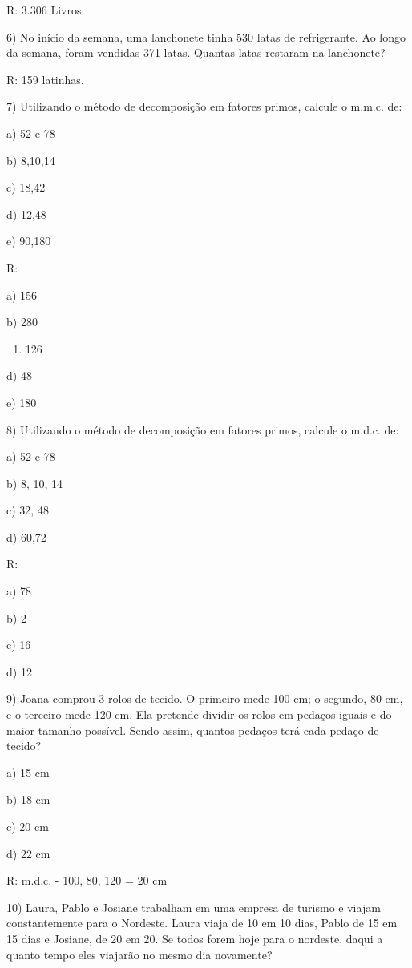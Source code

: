 R: 3.306 Livros

6) No início da semana, uma lanchonete tinha 530 latas de refrigerante.
Ao longo da semana, foram vendidas 371 latas. Quantas latas restaram na
lanchonete?

R: 159 latinhas.

7) Utilizando o método de decomposição em fatores primos, calcule o
m.m.c. de:

a) 52 e 78

b) 8,10,14

c) 18,42

d) 12,48

e) 90,180

R:

a) 156

b) 280

\begin{enumerate}
\def\labelenumi{\alph{enumi})}
\setcounter{enumi}{2}
\tightlist
\item
  126
\end{enumerate}

d) 48

e) 180

8) Utilizando o método de decomposição em fatores primos, calcule o
m.d.c. de:

a) 52 e 78

b) 8, 10, 14

c) 32, 48

d) 60,72

R:

a) 78

b) 2

c) 16

d) 12

9) Joana comprou 3 rolos de tecido. O primeiro mede 100 cm; o segundo,
80 cm, e o terceiro mede 120 cm. Ela pretende dividir os rolos em
pedaços iguais e do maior tamanho possível. Sendo assim, quantos pedaços
terá cada pedaço de tecido?

a) 15 cm

b) 18 cm

c) 20 cm

d) 22 cm

R: m.d.c. - 100, 80, 120 = 20 cm

10) Laura, Pablo e Josiane trabalham em uma empresa de turismo e viajam
constantemente para o Nordeste. Laura viaja de 10 em 10 dias, Pablo de
15 em 15 dias e Josiane, de 20 em 20. Se todos forem hoje para o
nordeste, daqui a quanto tempo eles viajarão no mesmo dia novamente?

